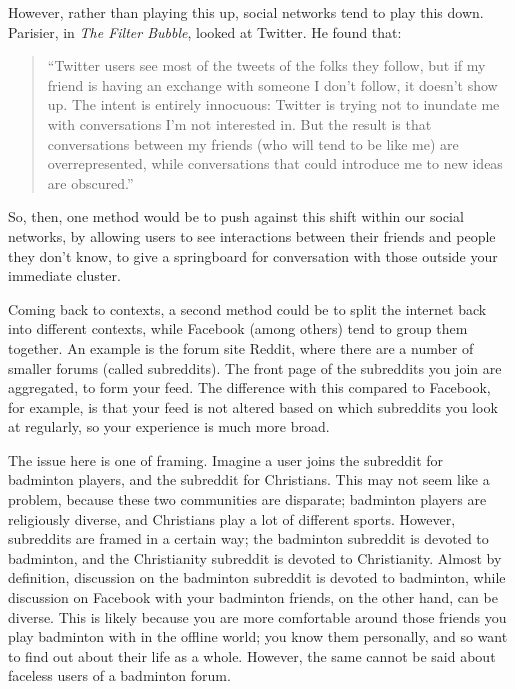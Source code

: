\documentclass[]{article}
\begin{document}
However, rather than playing this up, social networks tend to play this
down. Parisier, in \emph{The Filter Bubble}, looked at Twitter. He found
that:

\begin{quote}
``Twitter users see most of the tweets of the folks they follow, but if
my friend is having an exchange with someone I don't follow, it doesn't
show up. The intent is entirely innocuous: Twitter is trying not to
inundate me with conversations I'm not interested in. But the result is
that conversations between my friends (who will tend to be like me) are
overrepresented, while conversations that could introduce me to new
ideas are obscured.''\autocite[pg 150]{PariserFilterBubblewhat2012}
\end{quote}

So, then, one method would be to push against this shift within our
social networks, by allowing users to see interactions between their
friends and people they don't know, to give a springboard for
conversation with those outside your immediate cluster.

Coming back to contexts, a second method could be to split the internet
back into different contexts, while Facebook (among others) tend to
group them together. An example is the forum site Reddit, where there
are a number of smaller forums (called subreddits). The front page of
the subreddits you join are aggregated, to form your feed. The
difference with this compared to Facebook, for example, is that your
feed is not altered based on which subreddits you look at regularly, so
your experience is much more broad.

The issue here is one of framing. Imagine a user joins the subreddit for
badminton players, and the subreddit for Christians. This may not seem
like a problem, because these two communities are disparate; badminton
players are religiously diverse, and Christians play a lot of different
sports. However, subreddits are framed in a certain way; the badminton
subreddit is devoted to badminton, and the Christianity subreddit is
devoted to Christianity. Almost by definition, discussion on the
badminton subreddit is devoted to badminton, while discussion on
Facebook with your badminton friends, on the other hand, can be diverse.
This is likely because you are more comfortable around those friends you
play badminton with in the offline world; you know them personally, and
so want to find out about their life as a whole. However, the same
cannot be said about faceless users of a badminton forum.
\end{document}
